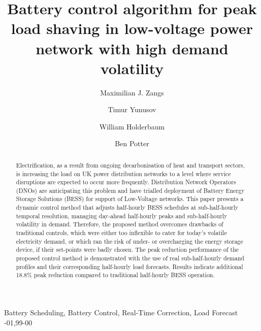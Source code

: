 \documentclass[final,3p,twocolumn]{elsarticle}
\begin{document}
\begin{frontmatter}

\title{Battery control algorithm for peak load shaving in low-voltage power network with high demand volatility}


\author[tsbe_address]{Maximilian J. Zangs}

\author[tsbe_address]{Timur Yunusov}

\author[sbs_address]{William Holderbaum}

\author[scs_address]{Ben Potter}

\address[tsbe_address]{TSBE Centre, J.J. Thomson Building, University of Reading, RG6 6AF, Reading, UK}
\address[sbs_address]{System's Engineering Building, University of Reading, RG6 6AY, Reading, UK}
\address[scs_address]{Chancellor's Building, University of Reading, RG6 6AY, Reading, UK}

\begin{abstract}

Electrification, as a result from ongoing decarbonisation of heat and transport sectors, is increasing the load on UK power distribution networks to a level where service disruptions are expected to occur more frequently.
Distribution Network Operators (DNOs) are anticipating this problem and have trialled deployment of Battery Energy Storage Solutions (BESS) for support of Low-Voltage networks.
This paper presents a dynamic control method that adjusts half-hourly BESS schedules at sub-half-hourly temporal resolution, managing day-ahead half-hourly peaks and sub-half-hourly volatility in demand.
Therefore, the proposed method overcomes drawbacks of traditional controls, which were either too inflexible to cater for today's volatile electricity demand, or which ran the risk of under- or overcharging the energy storage device, if their set-points were badly chosen.
The peak reduction performance of the proposed control method is demonstrated with the use of real sub-half-hourly demand profiles and their corresponding half-hourly load forecasts.
Results indicate additional 18.8\% peak reduction compared to traditional half-hourly BESS operation.

\end{abstract}

\begin{keyword}
Battery Scheduling, Battery Control, Real-Time Correction, Load Forecast
-01\sep  99-00
\end{keyword}

\end{frontmatter}
\end{document}
